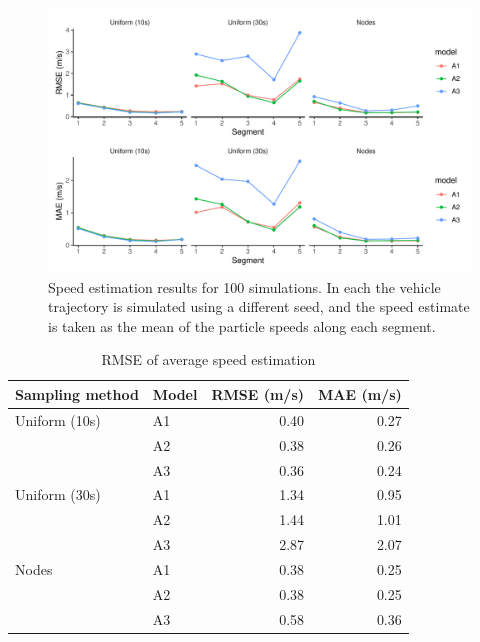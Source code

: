 \begin{knitrout}\small
{}\color{fgcolor}\begin{figure}
\includegraphics[width=\linewidth]{figure/sim1_pf_full-1} \caption[Speed estimation results for 100 simulations]{Speed estimation results for 100 simulations. In each the vehicle trajectory is simulated using a different seed, and the speed estimate is taken as the mean of the particle speeds along each segment.}\label{fig:sim1_pf_full}
\end{figure}

\begin{table}

\caption{\label{tab:sim1_pf_full}RMSE of average speed estimation}
\centering
\fontsize{8}{10}\selectfont
\begin{tabular}[t]{llrr}
\toprule
Sampling method & Model & RMSE (m/s) & MAE (m/s)\\
\midrule
Uniform (10s) & A1 & 0.40 & 0.27\\
 & A2 & 0.38 & 0.26\\
 & A3 & 0.36 & 0.24\\
\midrule
Uniform (30s) & A1 & 1.34 & 0.95\\
 & A2 & 1.44 & 1.01\\
 & A3 & 2.87 & 2.07\\
\midrule
Nodes & A1 & 0.38 & 0.25\\
 & A2 & 0.38 & 0.25\\
 & A3 & 0.58 & 0.36\\
\bottomrule
\end{tabular}
\end{table}


\end{knitrout}


